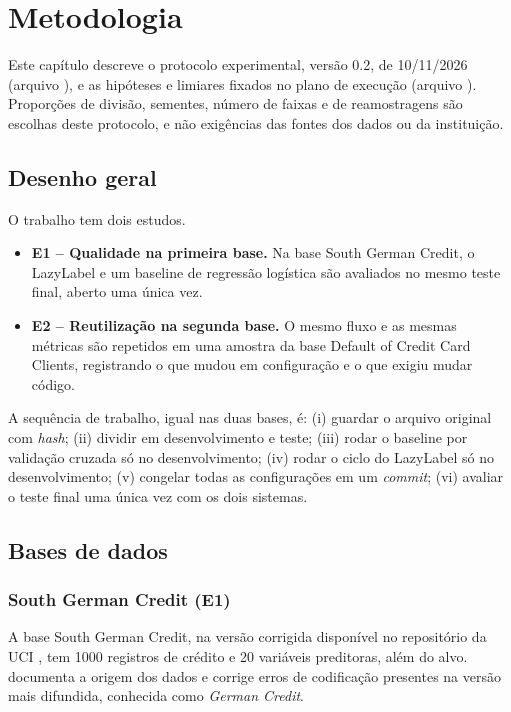 \chapter{Metodologia}
\label{cap:metodologia}

Este capítulo descreve o protocolo experimental, versão 0.2, de 10/11/2026 (arquivo ), e as hipóteses e limiares fixados no plano de execução (arquivo ). Proporções de divisão, sementes, número de faixas e de reamostragens são escolhas deste protocolo, e não exigências das fontes dos dados ou da instituição.

\section{Desenho geral}

O trabalho tem dois estudos.

\begin{itemize}
  \item \textbf{E1 -- Qualidade na primeira base.} Na base South German Credit, o LazyLabel e um baseline de regressão logística são avaliados no mesmo teste final, aberto uma única vez.
  \item \textbf{E2 -- Reutilização na segunda base.} O mesmo fluxo e as mesmas métricas são repetidos em uma amostra da base Default of Credit Card Clients, registrando o que mudou em configuração e o que exigiu mudar código.
\end{itemize}

A sequência de trabalho, igual nas duas bases, é: (i) guardar o arquivo original com \emph{hash}; (ii) dividir em desenvolvimento e teste; (iii) rodar o baseline por validação cruzada só no desenvolvimento; (iv) rodar o ciclo do LazyLabel só no desenvolvimento; (v) congelar todas as configurações em um \emph{commit}; (vi) avaliar o teste final uma única vez com os dois sistemas.

\section{Bases de dados}

\subsection{South German Credit (E1)}

A base South German Credit, na versão corrigida disponível no repositório da UCI \cite{uci573}, tem 1000 registros de crédito e 20 variáveis preditoras, além do alvo.  documenta a origem dos dados e corrige erros de codificação presentes na versão mais difundida, conhecida como \emph{German Credit}.

